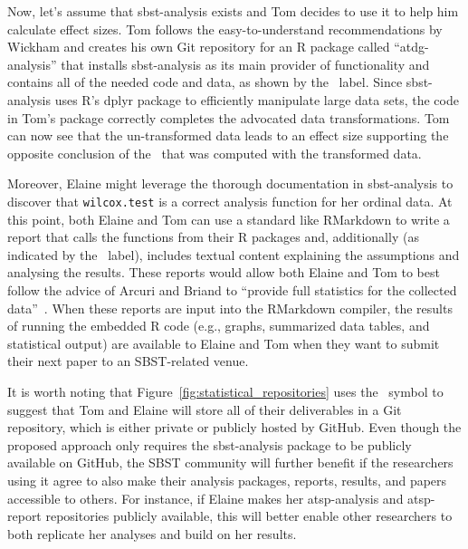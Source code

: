 Now, let's assume that sbst-analysis exists and Tom decides to use it to help him calculate effect sizes. Tom follows
the easy-to-understand recommendations by Wickham and creates his own Git repository for an R package called
``atdg-analysis'' that installs sbst-analysis as its main provider of functionality and contains all of the needed code
and data, as shown by the \codedatagit~label. Since sbst-analysis uses R's dplyr package to efficiently manipulate large
data sets, the code in Tom's package correctly completes the advocated data transformations.  Tom can now see that the
un-transformed data leads to an effect size supporting the opposite conclusion of the \atwelve~that was computed with
the transformed data.


Moreover, Elaine might leverage the thorough documentation in sbst-analysis to discover that {\tt wilcox.test} is a
correct analysis function for her ordinal data. At this point, both Elaine and Tom can use a standard like RMarkdown to
write a report that calls the functions from their R packages and, additionally (as indicated by the
\codeeditgit~label), includes textual content explaining the assumptions and analysing the results. These reports would
allow both Elaine and Tom to best follow the advice of Arcuri and Briand to ``provide full statistics for the collected
data''~\cite{Arcuri2014}. When these reports are input into the RMarkdown compiler, the results of running the
embedded R code (e.g., graphs, summarized data tables, and statistical output) are available to Elaine and Tom when they
want to submit their next paper to an SBST-related venue.

It is worth noting that Figure~\ref{fig:statistical_repositories} uses the \faGit~symbol to suggest that Tom and Elaine
will store all of their deliverables in a Git repository, which is either private or publicly hosted by GitHub. Even though
the proposed approach only requires the sbst-analysis package to be publicly available on GitHub, the SBST community will further
benefit if the researchers using it agree to also make their analysis packages, reports, results, and papers accessible
to others. For instance, if Elaine makes her atsp-analysis and atsp-report repositories publicly available, this will
better enable other researchers to both replicate her analyses and build on her results.
